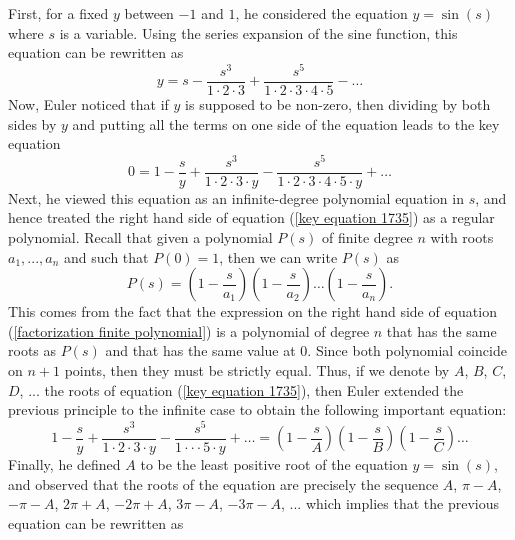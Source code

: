 First, for a fixed $y$ between $-1$ and $1$, he considered the equation $y = \sin(s)$ where $s$ is a variable. Using the series expansion of the sine function, this equation can be rewritten as
\begin{equation} \label{y = s - s^3/3!}
    y = s - \frac{s^3}{1\cdot 2 \cdot 3} + \frac{s^5}{1\cdot 2\cdot 3 \cdot 4 \cdot 5} - \dots
\end{equation}
Now, Euler noticed that if $y$ is supposed to be non-zero, then dividing by both sides by $y$ and putting all the terms on one side of the equation leads to the key equation
\begin{equation} \label{key equation 1735}
    0 = 1 - \frac{s}{y} + \frac{s^3}{1\cdot 2 \cdot 3\cdot y} - \frac{s^5}{1\cdot 2\cdot 3 \cdot 4 \cdot 5 \cdot y} + \dots
\end{equation}
Next, he viewed this equation as an infinite-degree polynomial equation in $s$, and hence treated the right hand side of equation (\ref{key equation 1735}) as a regular polynomial. Recall that given a polynomial $P(s)$ of finite degree $n$ with roots $a_1, ..., a_n$ and such that $P(0) = 1$, then we can write $P(s)$ as 
\begin{equation} \label{factorization finite polynomial}
P(s) = \left(1 - \frac{s}{a_1}\right)\left(1 - \frac{s}{a_2}\right) \dots \left(1 - \frac{s}{a_n}\right).
\end{equation}
This comes from the fact that the expression on the right hand side of equation (\ref{factorization finite polynomial}) is a polynomial of degree $n$ that has the same roots as $P(s)$ and that has the same value at 0. Since both polynomial coincide on $n+1$ points, then they must be strictly equal. Thus, if we denote by $A$, $B$, $C$, $D$, ... the roots of equation (\ref{key equation 1735}), then Euler extended the previous principle to the infinite case to obtain the following important equation:
\begin{equation} \label{equality between series and product}
    1 - \frac{s}{y} + \frac{s^3}{1\cdot 2 \cdot 3\cdot y} - \frac{s^5}{1\cdot \cdot \cdot 5 \cdot y} + \dots = \left(1 - \frac{s}{A}\right)\left(1 - \frac{s}{B}\right)\left(1 - \frac{s}{C}\right) \dots
\end{equation}
Finally, he defined $A$ to be the least positive root of the equation $y = \sin(s)$, and observed that the roots of the equation are precisely the sequence $A$, $\pi - A$, $-\pi - A$, $2\pi + A$, $-2\pi + A$, $3\pi - A$, $-3\pi - A$, ... which implies that the previous equation can be rewritten as 
